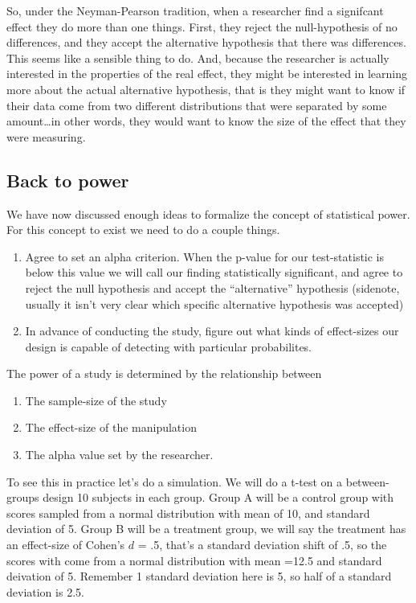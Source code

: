 \documentclass[
  letterpaper,
  DIV=11,
  numbers=noendperiod]{scrreprt}
\providecommand{\tightlist}{%
  \setlength{\itemsep}{0pt}\setlength{\parskip}{0pt}}\usepackage{longtable,booktabs,array}
\begin{document}
So, under the Neyman-Pearson tradition, when a researcher find a
signifcant effect they do more than one things. First, they reject the
null-hypothesis of no differences, and they accept the alternative
hypothesis that there was differences. This seems like a sensible thing
to do. And, because the researcher is actually interested in the
properties of the real effect, they might be interested in learning more
about the actual alternative hypothesis, that is they might want to know
if their data come from two different distributions that were separated
by some amount\ldots in other words, they would want to know the size of
the effect that they were measuring.

\subsection{Back to power}\label{back-to-power-1}

We have now discussed enough ideas to formalize the concept of
statistical power. For this concept to exist we need to do a couple
things.

\begin{enumerate}
\def\labelenumi{\arabic{enumi}.}
\tightlist
\item
  Agree to set an alpha criterion. When the p-value for our
  test-statistic is below this value we will call our finding
  statistically significant, and agree to reject the null hypothesis and
  accept the ``alternative'' hypothesis (sidenote, usually it isn't very
  clear which specific alternative hypothesis was accepted)
\item
  In advance of conducting the study, figure out what kinds of
  effect-sizes our design is capable of detecting with particular
  probabilites.
\end{enumerate}

The power of a study is determined by the relationship between

\begin{enumerate}
\def\labelenumi{\arabic{enumi}.}
\tightlist
\item
  The sample-size of the study
\item
  The effect-size of the manipulation
\item
  The alpha value set by the researcher.
\end{enumerate}

To see this in practice let's do a simulation. We will do a t-test on a
between-groups design 10 subjects in each group. Group A will be a
control group with scores sampled from a normal distribution with mean
of 10, and standard deviation of 5. Group B will be a treatment group,
we will say the treatment has an effect-size of Cohen's \(d\) = .5,
that's a standard deviation shift of .5, so the scores with come from a
normal distribution with mean =12.5 and standard deivation of 5.
Remember 1 standard deviation here is 5, so half of a standard deviation
is 2.5.
\end{document}
